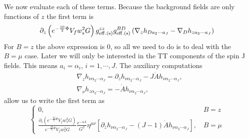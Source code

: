 \documentclass[a4paper,12pt]{article}
\begin{document}
We now evaluate each of these terms. Because the background fields are only functions of $z$ the first term is
\begin{equation}
\partial_z\left( e^{-\frac{10}{3} \Phi} V_f w_s^2 G \right) g^{zz}_{\rm{eff. (s)}}g^{BD}_{\rm{eff. (s)}}\left(\nabla_z h_{D a_2 \cdots a_J} - \nabla_D h_{z a_2 \cdots a_J}\right)
\label{eq:spin_j_eom_first_term}
\end{equation}
For $B = z$ the above expression is 0, so all we need to do is to deal with the $B=\mu$ case. Later we will only be interested in the TT components of the spin J fields. This means $a_i = \alpha_i, \, i = 1,\cdots, J$.
The auxiliary computations
\begin{align}
& \nabla_z h_{\nu \alpha_2 \cdots \alpha_J} = \partial_z h_{\nu \alpha_2 \cdots \alpha_J} - J \dot{A} h_{\nu \alpha_2 \cdots \alpha_J}, \\
& \nabla_\nu h_{z \alpha_2 \cdots \alpha_J} = - \dot{A} h_{\nu \alpha_2 \cdots \alpha_J},
\label{eq:spin_J_cod_id_1}
\end{align}
allow us to write the first term as
\begin{equation}
\begin{cases}
0, & B = z \\
\frac{\partial_{z}\left( e^{-\frac{10}{3} \Phi} V_f w_s^2 G \right)}{ e^{-\frac{10}{3} \Phi} V_f w_s^2 G} \frac{e^{-4A}}{G^2} \eta^{\mu \nu} \left[ \partial_z h_{\nu \alpha_2 \cdots \alpha_J} - \left(J-1\right) \dot{A} h_{\nu \alpha_2 \cdots \alpha_J} \right], \, &B = \mu
\end{cases}
\end{equation}
\end{document}
